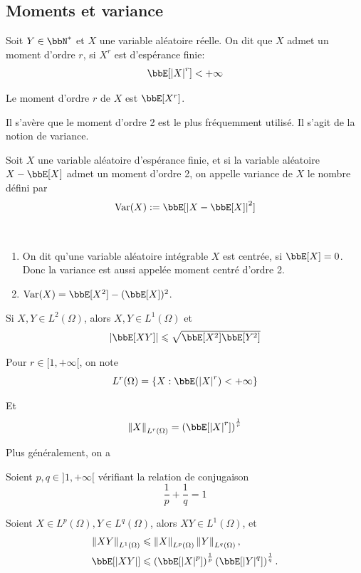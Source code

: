 \subsection{Moments et variance}

\begin{deff}
    Soit $Y \in \bbN^*$ et $X$ une variable aléatoire réelle.
    On dit que $X$ admet un moment d'ordre $r$, si $X^r$ est d'espérance finie:
    \[ \bbE[\lrvert{X}^r] < +\infty \]

    Le moment d'ordre $r$ de $X$ est $\bbE[X^r]$.
\end{deff}

Il s'avère que le moment d'ordre 2 est le plus fréquemment utilisé.
Il s'agit de la notion de variance.

\begin{deff}
    Soit $X$ une variable aléatoire d'espérance finie,
    et si la variable aléatoire $X - \bbE[X]$ admet un moment d'ordre 2,
    on appelle variance de $X$ le nombre défini par
    \[ \var(X) := \bbE[\lrvert{X - \bbE[X]}^2] \]
\end{deff}

\begin{rqq}
    $\ $
    \begin{enumerate}
        \item On dit qu'une variable aléatoire intégrable $X$ est centrée, si $\bbE[X] = 0$.
              Donc la variance est aussi appelée moment centré d'ordre 2.
        \item $\var(X) = \bbE[X^2] - (\bbE[X])^2$.
    \end{enumerate}
\end{rqq}

\begin{prop}
    Si $X, Y \in L^2(\Omega)$, alors $X, Y \in L^1(\Omega)$ et
    \[ \lrvert{\bbE[XY]} \leqslant \sqrt{\bbE[X^2] \bbE[Y^2]} \]
\end{prop}

\begin{rqq}
    Pour $r \in [1, +\infty[$, on note
    \[ L^r(\Omega) = \{ X: \bbE(\lrvert{X}^r) < +\infty \} \]

    Et
    \[ \lrVert{X}_{L^r(\Omega)} = \left(\bbE[\lrvert{X}^r]\right)^{\frac{1}{r}} \]
\end{rqq}

Plus généralement, on a
\begin{prop}
    Soient $p, q \in ]1, +\infty[$ vérifiant la relation de conjugaison
    \[ \frac{1}{p} + \frac{1}{q} = 1 \]

    Soient $X \in L^p(\Omega), Y \in L^q(\Omega)$, alors $XY \in L^1(\Omega)$, et
    \begin{align*}
        \lrVert{XY}_{L^1(\Omega)} & \leqslant \lrVert{X}_{L^p(\Omega)} \lrVert{Y}_{L^q(\Omega)},                                           \\
        \bbE[\lrvert{XY}]         & \leqslant \left(\bbE[\lrvert{X}^p]\right)^{\frac{1}{p}} \left(\bbE[\lrvert{Y}^q]\right)^{\frac{1}{q}}.
    \end{align*}
\end{prop}

